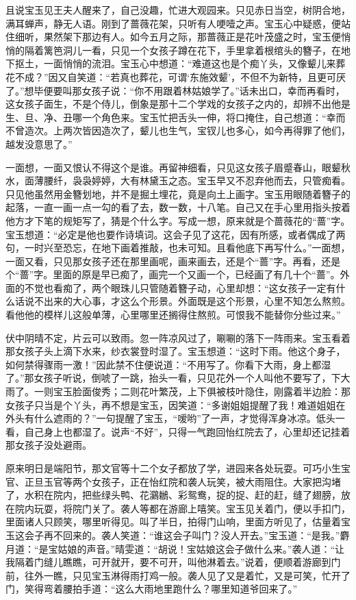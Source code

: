\documentclass[12pt,oneside]{book}
\begin{document}
且说宝玉见王夫人醒来了，自己没趣，忙进大观园来。只见赤日当空，树阴合地，满耳蝉声，静无人语。刚到了蔷薇花架，只听有人哽噎之声。宝玉心中疑惑，便站住细听，果然架下那边有人。如今五月之际，那蔷薇正是花叶茂盛之时，宝玉便悄悄的隔着篱笆洞儿一看，只见一个女孩子蹲在花下，手里拿着根绾头的簪子，在地下抠土，一面悄悄的流泪。宝玉心中想道：“难道这也是个痴丫头，又像颦儿来葬花不成？”因又自笑道：“若真也葬花，可谓‘东施效颦’，不但不为新特，且更可厌了。”想毕便要叫那女孩子说：“你不用跟着林姑娘学了。”话未出口，幸而再看时，这女孩子面生，不是个侍儿，倒象是那十二个学戏的女孩子之内的，却辨不出他是生、旦、净、丑哪一个角色来。宝玉忙把舌头一伸，将口掩住，自己想道：“幸而不曾造次。上两次皆因造次了，颦儿也生气，宝钗儿也多心，如今再得罪了他们，越发没意思了。”

一面想，一面又恨认不得这个是谁。再留神细看，只见这女孩子眉蹙春山，眼颦秋水，面薄腰纤，袅袅婷婷，大有林黛玉之态。宝玉早又不忍弃他而去，只管痴看。只见他虽然用金簪划地，并不是掘土埋花，竟是向土上画字。宝玉用眼随着簪子的起落，一直一画一点一勾的看了去，数一数，十八笔。自己又在手心里用指头按着他方才下笔的规矩写了，猜是个什么字。写成一想，原来就是个蔷薇花的“蔷”字。宝玉想道：“必定是他也要作诗填词。这会子见了这花，因有所感，或者偶成了两句，一时兴至恐忘，在地下画着推敲，也未可知。且看他底下再写什么。”一面想，一面又看，只见那女孩子还在那里画呢，画来画去，还是个“蔷”字。再看，还是个“蔷”字。里面的原是早已痴了，画完一个又画一个，已经画了有几十个“蔷”。外面的不觉也看痴了，两个眼珠儿只管随着簪子动，心里却想：“这女孩子一定有什么话说不出来的大心事，才这么个形景。外面既是这个形景，心里不知怎么熬煎。看他他的模样儿这般单薄，心里哪里还搁得住熬煎。可恨我不能替你分些过来。”

伏中阴晴不定，片云可以致雨。忽一阵凉风过了，唰唰的落下一阵雨来。宝玉看着那女孩子头上滴下水来，纱衣裳登时湿了。宝玉想道：“这时下雨。他这个身子，如何禁得骤雨一激！”因此禁不住便说道：“不用写了。你看下大雨，身上都湿了。”那女孩子听说，倒唬了一跳，抬头一看，只见花外一个人叫他不要写了，下大雨了。一则宝玉脸面俊秀；二则花叶繁茂，上下俱被枝叶隐住，刚露着半边脸：那女孩子只当是个丫头，再不想是宝玉，因笑道：“多谢姐姐提醒了我！难道姐姐在外头有什么遮雨的？”一句提醒了宝玉，“嗳哟”了一声，才觉得浑身冰凉。低头一看，自己身上也都湿了。说声“不好”，只得一气跑回怡红院去了，心里却还记挂着那女孩子没处避雨。

原来明日是端阳节，那文官等十二个女子都放了学，进园来各处玩耍。可巧小生宝官、正旦玉官等两个女孩子，正在怡红院和袭人玩笑，被大雨阻住。大家把沟堵了，水积在院内，把些绿头鸭、花鸂鶒、彩鸳鸯，捉的捉、赶的赶，缝了翅膀，放在院内玩耍，将院门关了。袭人等都在游廊上嘻笑。宝玉见关着门，便以手扣门，里面诸人只顾笑，哪里听得见。叫了半日，拍得门山响，里面方听见了，估量着宝玉这会子再不回来的。袭人笑道：“谁这会子叫门？没人开去。”宝玉道：“是我。”麝月道：“是宝姑娘的声音。”晴雯道：“胡说！宝姑娘这会子做什么来。”袭人道：“让我隔着门缝儿瞧瞧，可开就开，要不可开，叫他淋着去。”说着，便顺着游廊到门前，往外一瞧，只见宝玉淋得雨打鸡一般。袭人见了又是着忙，又是可笑，忙开了门，笑得弯着腰拍手道：“这么大雨地里跑什么？哪里知道爷回来了。”
\end{document}
